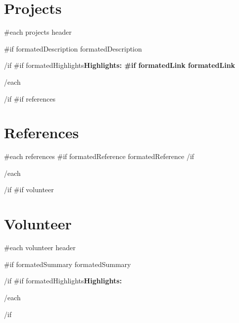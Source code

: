 \documentclass{article}
{{ markdownPackage }}
\begin{document}
\begin{paracol}{2}
\begin{rightcolumn}
\section*{Projects} {
  {{#each projects}}
    {{ header }}\par
    {{#if formatedDescription}}
      {{ formatedDescription }}
      \par
    {{/if}}
    {{#if formatedHighlights}}\bfseries Highlights: 
    {{#if formatedLink}}{{ formatedLink }}
    \par
  {{/each}}
}
{{/if}}
{{#if references}}
\section*{References} {
  {{#each references}}
    {{#if formatedReference}}{{ formatedReference }}{{/if}}
    \par
  {{/each}}
}
{{/if}}
{{#if volunteer}}
\section*{Volunteer} {
  {{#each volunteer}}
    {{ header }}\par
    {{#if formatedSummary}}
      {{ formatedSummary }}
      \par
    {{/if}}
    {{#if formatedHighlights}}\bfseries Highlights: 
    \par
  {{/each}}
}
{{/if}}

\end{rightcolumn}
\end{paracol}
\end{document}
